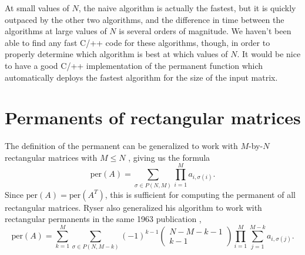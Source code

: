 \documentclass{article}
\begin{document}
At small values of $N$, the naive algorithm is actually the fastest, but it is quickly outpaced by
the other two algorithms, and the difference in time between the algorithms at large values of $N$
is several orders of magnitude. We haven't been able to find any fast C/++ code for these
algorithms, though, in order to properly determine which algorithm is best at which values of $N$.
It would be nice to have a good C/++ implementation of the permanent function which automatically
deploys the fastest algorithm for the size of the input matrix.

\section*{Permanents of rectangular matrices}

The definition of the permanent can be generalized to work with $M$-by-$N$ rectangular matrices with
$M \leq N$ \cite{wiki:permanent}, giving us the formula
\begin{equation} \label{eq:rectper1}
    \text{per}(A) = \sum_{\sigma \in P(N,M)}{\prod_{i=1}^M{a_{i,{\sigma(i)}}}}.
\end{equation}
Since $\text{per}(A) = \text{per}(A^T)$, this is sufficient for computing
the permanent of all rectangular matrices. Ryser also generalized his algorithm to work with
rectangular permanents in the same 1963 publication \cite{wiki:permanent,ryser1963},
\begin{equation} \label{eq:rectper2}
    \text{per}(A) = \sum_{k=1}^{M}{
        \sum_{\sigma \in P(N,M-k)}{
            {\left(-1\right)}^{k-1} \left(\begin{matrix}N - M - k - 1\\ k - 1\end{matrix}\right)
            \prod_{i=1}^M{
                \sum_{j=1}^{M-k}{a_{i,{\sigma(j)}}}
            }
        }
    }.
\end{equation}
\end{document}

